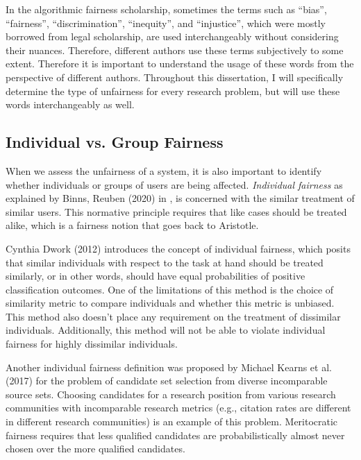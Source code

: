     In the algorithmic fairness scholarship, sometimes the terms such as ``bias'', ``fairness'', ``discrimination'', ``inequity'', and ``injustice'', which were mostly borrowed from legal scholarship, are used interchangeably without considering their nuances. Therefore, different authors use these terms subjectively to some extent. Therefore it is important to understand the usage of these words from the perspective of different authors. Throughout this dissertation, I will specifically determine the type of unfairness for every research problem, but will use these words interchangeably as well.
    
    \subsection{Individual vs. Group Fairness}
        
        When we assess the unfairness of a system, it is also important to identify whether individuals or groups of users are being affected. \textit{Individual fairness} as explained by Binns, Reuben (2020) in \cite{binns2020conflict}, is concerned with the similar treatment of similar users. This normative principle requires that like cases should be treated alike, which is a fairness notion that goes back to Aristotle. 
        
        Cynthia Dwork (2012) \cite{Dwork2012individual} introduces the concept of individual fairness, which posits that similar individuals with respect to the task at hand should be treated similarly, or in other words, should have equal probabilities of positive classification outcomes. One of the limitations of this method is the choice of similarity metric to compare individuals and whether this metric is unbiased. This method also doesn't place any requirement on the treatment of dissimilar individuals. Additionally, this method will not be able to violate individual fairness for highly dissimilar individuals. 
        
        Another individual fairness definition was proposed by Michael Kearns et al. (2017) \cite{pmlr-v70-kearns17a} for the problem of candidate set selection from diverse incomparable source sets. Choosing candidates for a research position from various research communities with incomparable research metrics (e.g., citation rates are different in different research communities) is an example of this problem. Meritocratic fairness requires that less qualified candidates are probabilistically almost never chosen over the more qualified candidates.
        
